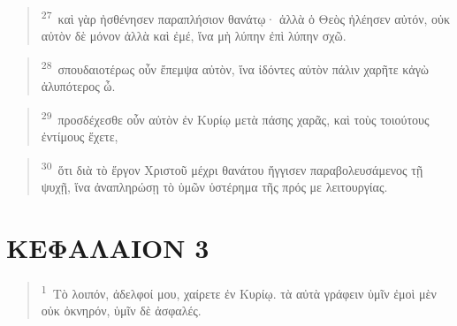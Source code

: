 \documentclass{article}
\newcommand{\currentverse}{1} %
\newcommand{\setcurrentverse}[1]{\renewcommand{\currentverse}{#1}}
\begin{document}
\begin{verse}

\setcurrentverse{27}

\setcounter{footnote}{0}

\textsuperscript{27}~καὶ γὰρ ἠσθένησεν παραπλήσιον θανάτῳ· ἀλλὰ ὁ Θεὸς ἠλέησεν αὐτόν, οὐκ αὐτὸν δὲ μόνον ἀλλὰ καὶ ἐμέ, ἵνα μὴ λύπην ἐπὶ λύπην σχῶ.

\end{verse}

\begin{verse}

\setcurrentverse{28}

\setcounter{footnote}{0}

\textsuperscript{28}~σπουδαιοτέρως οὖν ἔπεμψα αὐτὸν, ἵνα ἰδόντες αὐτὸν πάλιν χαρῆτε κἀγὼ ἀλυπότερος ὦ.

\end{verse}

\begin{verse}

\setcurrentverse{29}

\setcounter{footnote}{0}

\textsuperscript{29}~προσδέχεσθε οὖν αὐτὸν ἐν Κυρίῳ μετὰ πάσης χαρᾶς, καὶ τοὺς τοιούτους ἐντίμους ἔχετε,

\end{verse}

\begin{verse}

\setcurrentverse{30}

\setcounter{footnote}{0}

\textsuperscript{30}~ὅτι διὰ τὸ ἔργον Χριστοῦ μέχρι θανάτου ἤγγισεν παραβολευσάμενος τῇ ψυχῇ, ἵνα ἀναπληρώσῃ τὸ ὑμῶν ὑστέρημα τῆς πρός με λειτουργίας.

\end{verse}

\section*{ΚΕΦΑΛΑΙΟΝ 3}

\begin{verse}

\setcurrentverse{1}

\setcounter{footnote}{0}

\textsuperscript{1}~Τὸ λοιπόν, ἀδελφοί μου, χαίρετε ἐν Κυρίῳ. τὰ αὐτὰ γράφειν ὑμῖν ἐμοὶ μὲν οὐκ ὀκνηρόν, ὑμῖν δὲ ἀσφαλές.

\end{verse}
\end{document}
